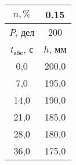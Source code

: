 \begin{tabular}[t]{|c|c|}
\hline
$n, \%$ & 0.15 \\
\hline
$P$, дел & 200 \\
\hline
$t_{абс}$, с & $h$, мм \\ 
\hline
0,0 & 200,0 \\ 
7,0 & 195,0 \\ 
14,0 & 190,0 \\ 
21,0 & 185,0 \\ 
28,0 & 180,0 \\ 
36,0 & 175,0 \\ 
\hline
\end{tabular}